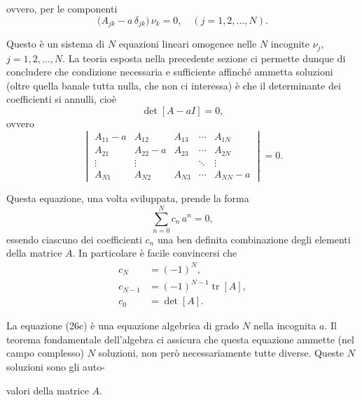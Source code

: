 \documentclass[11pt, a4paper]{book}
\numberwithin{equation}{section}
\begin{document}

ovvero, per le componenti
\begin{equation}
\bigl(A_{jk} - a\,\delta_{jk}\bigr)\,\nu_k = 0,
\quad (j = 1,2,\ldots,N). \tag{25b}
\end{equation}

Questo è un sistema di $N$ equazioni lineari omogenee nelle $N$ incognite
$\nu_j$, $j = 1, 2, \ldots, N$. La teoria esposta nella precedente
sezione ci permette dunque di concludere che condizione necessaria e
sufficiente affinché ammetta soluzioni (oltre quella banale tutta nulla,
che non ci interessa) è che il determinante dei coefficienti si annulli,
cioè
\begin{equation}
\det[A - aI] = 0, \tag{26a}
\end{equation}
ovvero
\begin{equation}
\begin{vmatrix}
A_{11}-a & A_{12}   & A_{13}   & \cdots & A_{1N}   \\
A_{21}   & A_{22}-a & A_{23}   & \cdots & A_{2N}   \\
\vdots   & \vdots   &          & \ddots & \vdots   \\
A_{N1}   & A_{N2}   & A_{N3}   & \cdots & A_{NN}-a
\end{vmatrix}
= 0. \tag{26b}
\end{equation}

Questa equazione, una volta sviluppata, prende la forma
\begin{equation}
\sum_{n=0}^{N} c_n\, a^n = 0, \tag{26c}
\end{equation}
essendo ciascuno dei coefficienti $c_n$ una ben definita combinazione
degli elementi della matrice $A$. In particolare è facile convincersi che
\begin{align}
c_N   &= (-1)^N, \tag{27} \\
c_{N-1} &= (-1)^{N-1}\operatorname{tr}[A], \tag{28} \\
c_0   &= \det[A]. \tag{29}
\end{align}

La equazione (26c) è una equazione algebrica di grado $N$ nella incognita
$a$. Il teorema fondamentale dell'algebra ci assicura che questa equazione
ammette (nel campo complesso) $N$ soluzioni, non però necessariamente
tutte diverse. Queste $N$ soluzioni sono gli auto-


valori della matrice $A$.
\end{document}
